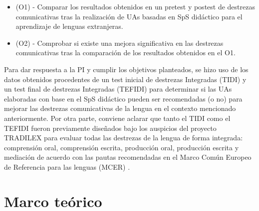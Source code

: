 \documentclass[spanish]{textolivre}
\begin{document}
\begin{itemize}
    \item (O1) - Comparar los resultados obtenidos en un pretest y postest de destrezas comunicativas tras la realización de UAs basadas en SpS didáctico para el aprendizaje de lenguas extranjeras.
    \item (O2) - Comprobar si existe una mejora significativa en las destrezas comunicativas tras la comparación de los resultados obtenidos en el O1.
\end{itemize}

Para dar respuesta a la PI y cumplir los objetivos planteados, se hizo uso de los datos obtenidos procedentes de un test inicial de destrezas Integradas (TIDI) y un test final de destrezas Integradas (TEFIDI) para determinar si las UAs elaboradas con base en el SpS didáctico pueden ser recomendadas (o no) para mejorar las destrezas comunicativas de la lengua en el contexto mencionado anteriormente. Por otra parte, conviene aclarar que tanto el TIDI como el TEFIDI \cite{fraga-castrillon2021} fueron previamente diseñados bajo los auspicios del proyecto TRADILEX para evaluar todas las destrezas de la lengua de forma integrada: comprensión oral, comprensión escrita, producción oral, producción escrita y mediación de acuerdo con las pautas recomendadas en el Marco Común Europeo de Referencia para las lenguas (MCER) \cite{councilofeurope2018}. 

\section{Marco teórico}\label{sec-2}
\end{document}
